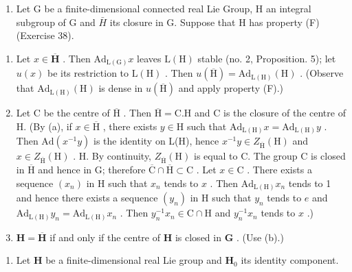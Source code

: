 \begin{enumerate}
\def\labelenumi{\arabic{enumi}.}
\setcounter{enumi}{38}
\tightlist
\item
  Let G be a finite-dimensional connected real Lie Group, H an integral subgroup of G and \(\bar{H}\) its closure in G. Suppose that H has property (F) (Exercise 38).
\end{enumerate}

\begin{enumerate}
\def\labelenumi{(\alph{enumi})}
\item
  Let \(x \in \overline{\mathbf{H}}\) . Then \(\mathrm{Ad}_{\mathrm{L(G)}}x\) leaves \(\mathrm{L(H)}\) stable (no. 2, Proposition. 5); let \(u(x)\) be its restriction to \(\mathrm{L(H)}\) . Then \(u(\overline{\mathrm{H}}) = \mathrm{Ad}_{\mathrm{L(H)}}(\mathrm{H})\) . (Observe that \(\mathrm{Ad}_{\mathrm{L(H)}}(\mathrm{H})\) is dense in \(u(\overline{\mathrm{H}})\) and apply property (F).)
\item
  Let C be the centre of \(\overline{\mathrm{H}}\) . Then \(\overline{\mathrm{H}} = \mathrm{C.H}\) and C is the closure of the centre of H. (By (a), if \(x \in \overline{\mathrm{H}}\) , there exists \(y \in \mathrm{H}\) such that \(\mathrm{Ad}_{\mathrm{L(H)}} x = \mathrm{Ad}_{\mathrm{L(H)}} y\) . Then \(\mathrm{Ad}(x^{-1}y)\) is the identity on L(H), hence \(x^{-1}y \in Z_{\overline{\mathrm{H}}}(\mathrm{H})\) and \(x \in Z_{\overline{\mathrm{H}}}(\mathrm{H})\) . H. By continuity, \(Z_{\overline{\mathrm{H}}}(\mathrm{H})\) is equal to C. The group C is closed in \(\overline{\mathrm{H}}\) and hence in G; therefore \(\overline{\mathrm{C}} \cap \overline{\mathrm{H}} \subset \mathrm{C}\) . Let \(x \in \mathrm{C}\) . There exists a sequence \((x_n)\) in H such that \(x_n\) tends to \(x\) . Then \(\mathrm{Ad}_{\mathrm{L(H)}} x_n\) tends to 1 and hence there exists a sequence \((y_n)\) in H such that \(y_n\) tends to \(e\) and \(\mathrm{Ad}_{\mathrm{L(H)}} y_n = \mathrm{Ad}_{\mathrm{L(H)}} x_n\) . Then \(y_n^{-1}x_n \in \mathrm{C} \cap \mathrm{H}\) and \(y_n^{-1}x_n\) tends to \(x\) .)
\item
  \(\mathbf{H} = \overline{\mathbf{H}}\) if and only if the centre of \(\mathbf{H}\) is closed in \(\mathbf{G}\) . (Use (b).)
\end{enumerate}

\begin{enumerate}
\def\labelenumi{\arabic{enumi}.}
\setcounter{enumi}{39}
\tightlist
\item
  Let \(\mathbf{H}\) be a finite-dimensional real Lie group and \(\mathbf{H}_0\) its identity component.
\end{enumerate}


